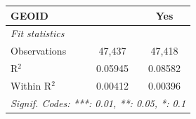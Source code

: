 \begin{tabular}{lcc}
   GEOID                                                               &                & Yes\\  
   \midrule
   \emph{Fit statistics}\\
   Observations                                                        & 47,437         & 47,418\\  
   R$^2$                                                               & 0.05945        & 0.08582\\  
   Within R$^2$                                                        & 0.00412        & 0.00396\\  
   \midrule \midrule
   \multicolumn{3}{l}{\emph{Signif. Codes: ***: 0.01, **: 0.05, *: 0.1}}\\
\end{tabular}
\par\endgroup
